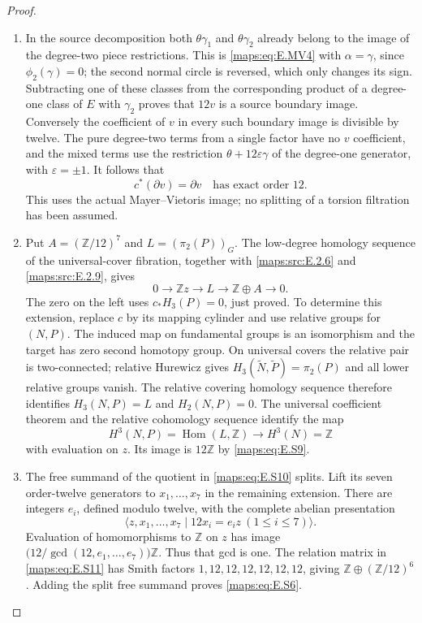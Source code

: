 \begin{proof}
\begin{enumerate}[label=\arabic*.,leftmargin=*]
\item In the source decomposition both $\theta\gamma_1$ and
$\theta\gamma_2$ already belong to the image of the degree-two
piece restrictions. This is \eqref{maps:eq:E.MV4} with $\alpha=\gamma$,
since $\phi_2(\gamma)=0$; the second normal circle is reversed,
which only changes its sign. Subtracting one of these classes
from the corresponding product of a degree-one class of $E$
with $\gamma_2$ proves that $12v$ is a source boundary image.
Conversely the coefficient of $v$ in every such boundary image
is divisible by twelve. The pure degree-two terms from a single
factor have no $v$ coefficient, and the mixed terms use the
restriction $\theta+12\varepsilon\gamma$ of the degree-one
generator, with $\varepsilon=\pm1$. It follows that
\[
                  c^*(\partial v)=\partial v
        \quad\text{has exact order }12.
 \tag{E.S9}\label{maps:eq:E.S9}
\]
This uses the actual Mayer--Vietoris image; no splitting of a
torsion filtration has been assumed.

\item Put $A=(\mathbb Z/12)^7$ and $L=(\pi_2(P))_G$.
The low-degree homology sequence of the universal-cover
fibration, together with \ref{maps:src:E.2.6} and \ref{maps:src:E.2.9}, gives
\[
             0\longrightarrow\mathbb Z z\longrightarrow L
                \longrightarrow\mathbb Z\oplus A\longrightarrow0.
 \tag{E.S10}\label{maps:eq:E.S10}
\]
The zero on the left uses $c_*H_3(P)=0$, just proved.
To determine this extension, replace $c$ by its mapping cylinder
and use relative groups for $(N,P)$. The induced map on fundamental
groups is an isomorphism and the target has zero second homotopy
group. On universal covers the relative pair is two-connected;
relative Hurewicz gives
$H_3(\widetilde N,\widetilde P)=\pi_2(P)$ and all lower relative
groups vanish. The relative covering homology sequence therefore
identifies $H_3(N,P)=L$ and $H_2(N,P)=0$.
The universal coefficient theorem and the relative cohomology
sequence identify the map
\[
       H^3(N,P)=\operatorname{Hom}(L,\mathbb Z)
         \longrightarrow H^3(N)=\mathbb Z
\]
with evaluation on $z$. Its image is $12\mathbb Z$ by \eqref{maps:eq:E.S9}.

\item The free summand of the quotient in \eqref{maps:eq:E.S10} splits. Lift its
seven order-twelve generators to $x_1,\ldots,x_7$ in the
remaining extension. There are integers $e_i$, defined modulo
twelve, with the complete abelian presentation
\[
        \langle z,x_1,\ldots,x_7\mid
                      12x_i=e_i z\ (1\leq i\leq7)\rangle.
 \tag{E.S11}\label{maps:eq:E.S11}
\]
Evaluation of homomorphisms to $\mathbb Z$ on $z$ has image
$\bigl(12/\gcd(12,e_1,\ldots,e_7)\bigr)\mathbb Z$.
Thus that gcd is one. The relation matrix in \eqref{maps:eq:E.S11} has
Smith factors $1,12,12,12,12,12,12$, giving
$\mathbb Z\oplus(\mathbb Z/12)^6$. Adding the split free
summand proves \eqref{maps:eq:E.S6}.


\end{enumerate}
\end{proof}
